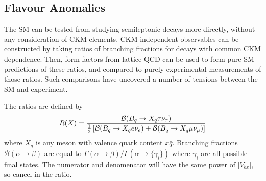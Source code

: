 \subsection{Flavour Anomalies}

The SM can be tested from studying semileptonic decays more directly, without any consideration of CKM elements. CKM-independent observables can be constructed by taking ratios of branching fractions for decays with common CKM dependence. Then, form factors from lattice QCD can be used to form pure SM predictions of these ratios, and compared to purely experimental measurements of those ratios. Such comparisons have uncovered a number of tensions between the SM and experiment.

The ratios are defined by
\begin{align}
	R(X) = {\mathcal{B}(B_q\to X_q \tau \nu_{\tau}) \over {1\over 2}\left[\mathcal{B}(B_q\to X_q e \nu_e) + \mathcal{B}(B_q\to X_q \mu \nu_{\mu}) \right]}
\end{align}
where $X_q$ is any meson with valence quark content $x\bar{q}$. Branching fractions $\mathcal{B}(\alpha\to \beta)$ are equal to $\Gamma(\alpha\to \beta)/\Gamma(\alpha\to \{\gamma_i\})$ where $\gamma_i$ are all possible final states. The numerator and denomenator will have the same power of $|V_{bx}|$, so cancel in the ratio.

